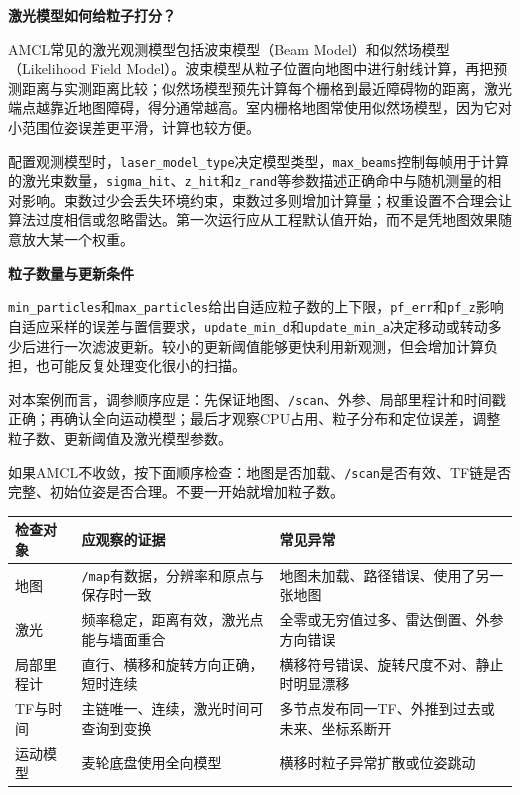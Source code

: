 \documentclass[UTF8,zihao=-4]{ctexart}
\DeclareRobustCommand{\code}[1]{\texttt{#1}}
\begin{document}
\textbf{激光模型如何给粒子打分？}

AMCL常见的激光观测模型包括波束模型（Beam Model）和似然场模型（Likelihood Field Model）。波束模型从粒子位置向地图中进行射线计算，再把预测距离与实测距离比较；似然场模型预先计算每个栅格到最近障碍物的距离，激光端点越靠近地图障碍，得分通常越高。室内栅格地图常使用似然场模型，因为它对小范围位姿误差更平滑，计算也较方便。

配置观测模型时，\code{laser\_model\_type}决定模型类型，\code{max\_beams}控制每帧用于计算的激光束数量，\code{sigma\_hit}、\code{z\_hit}和\code{z\_rand}等参数描述正确命中与随机测量的相对影响。束数过少会丢失环境约束，束数过多则增加计算量；权重设置不合理会让算法过度相信或忽略雷达。第一次运行应从工程默认值开始，而不是凭地图效果随意放大某一个权重。

\textbf{粒子数量与更新条件}

\code{min\_particles}和\code{max\_particles}给出自适应粒子数的上下限，\code{pf\_err}和\code{pf\_z}影响自适应采样的误差与置信要求，\code{update\_min\_d}和\code{update\_min\_a}决定移动或转动多少后进行一次滤波更新。较小的更新阈值能够更快利用新观测，但会增加计算负担，也可能反复处理变化很小的扫描。

对本案例而言，调参顺序应是：先保证地图、\code{/scan}、外参、局部里程计和时间戳正确；再确认全向运动模型；最后才观察CPU占用、粒子分布和定位误差，调整粒子数、更新阈值及激光模型参数。

如果AMCL不收敛，按下面顺序检查：地图是否加载、\code{/scan}是否有效、TF链是否完整、初始位姿是否合理。不要一开始就增加粒子数。

\begin{table}[H]
\centering
\begin{tabular}{|p{}|p{}|p{}|}
\hline
\textbf{检查对象} & \textbf{应观察的证据} & \textbf{常见异常} \\
\hline
地图 & \code{/map}有数据，分辨率和原点与保存时一致 & 地图未加载、路径错误、使用了另一张地图 \\
\hline
激光 & 频率稳定，距离有效，激光点能与墙面重合 & 全零或无穷值过多、雷达倒置、外参方向错误 \\
\hline
局部里程计 & 直行、横移和旋转方向正确，短时连续 & 横移符号错误、旋转尺度不对、静止时明显漂移 \\
\hline
TF与时间 & 主链唯一、连续，激光时间可查询到变换 & 多节点发布同一TF、外推到过去或未来、坐标系断开 \\
\hline
运动模型 & 麦轮底盘使用全向模型 & 横移时粒子异常扩散或位姿跳动 \\
\hline
\end{tabular}
\end{table}
\end{document}
